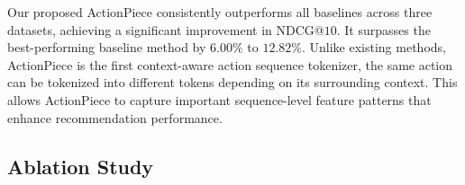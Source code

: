 Our proposed ActionPiece consistently outperforms all baselines across three datasets, achieving a significant improvement in NDCG@$10$. It surpasses the best-performing baseline method by $6.00\%$ to $12.82\%$. Unlike existing methods, ActionPiece is the first context-aware action sequence tokenizer, \ie the same action can be tokenized into different tokens depending on its surrounding context. This allows ActionPiece to capture important sequence-level feature patterns that enhance recommendation performance.



\subsection{Ablation Study}\label{sec:ablation}

